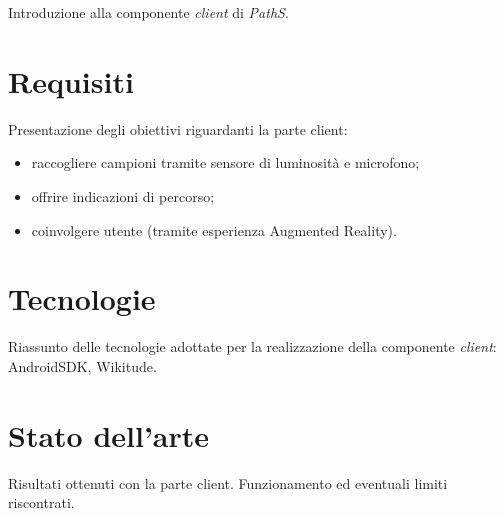 Introduzione alla componente \emph{client} di \emph{PathS}. 

\section{Requisiti}
Presentazione degli obiettivi riguardanti la parte client:
\begin{itemize}
\item raccogliere campioni tramite sensore di luminosità e microfono;
\item offrire indicazioni di percorso;
\item coinvolgere utente (tramite esperienza Augmented Reality).
\end{itemize}

\section{Tecnologie}
Riassunto delle tecnologie adottate per la realizzazione della componente \emph{client}: AndroidSDK, Wikitude.

\section{Stato dell'arte}
Risultati ottenuti con la parte client. Funzionamento ed eventuali limiti riscontrati.

